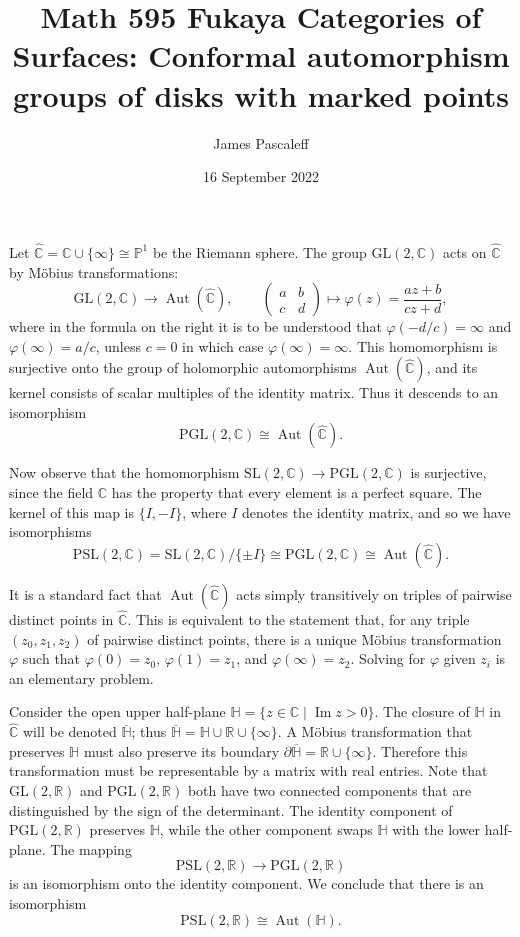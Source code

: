 \documentclass[12pt]{article}
\theoremstyle{definition}
\theoremstyle{remark}
\newcommand{\R}{\mathbb{R}}
\newcommand{\C}{\mathbb{C}}
\DeclareMathOperator{\Aut}{Aut}
\renewcommand{\phi}{\varphi}
\newcommand{\hC}{\widehat{\mathbb{C}}}
\newcommand{\bP}{\mathbb{P}}
\newcommand{\bH}{\mathbb{H}}
\newcommand{\GL}{\mathrm{GL}}
\newcommand{\SL}{\mathrm{SL}}
\newcommand{\PGL}{\mathrm{PGL}}
\newcommand{\PSL}{\mathrm{PSL}}
\DeclareMathOperator{\im}{\mathrm{Im}}
\begin{document}
\title{Math 595 Fukaya Categories of Surfaces: Conformal automorphism groups of disks with marked points}
\author{James Pascaleff}
\date{16 September 2022}
\maketitle

Let $\hC = \C \cup \{\infty\} \cong \bP^{1}$ be the Riemann sphere. The group $\GL(2,\C)$ acts on $\hC$ by M\"{o}bius transformations:
\begin{equation*}
  \GL(2,\C) \to \Aut(\hC), \qquad \begin{pmatrix}a&b\\ c&d\end{pmatrix} \mapsto \phi(z) = \frac{az+b}{cz+d},
\end{equation*}
where in the formula on the right it is to be understood that $\phi(-d/c) = \infty$ and $\phi(\infty) = a/c$, unless $c = 0$ in which case $\phi(\infty) = \infty$.
This homomorphism is surjective onto the group of holomorphic automorphisms $\Aut(\hC)$, and its kernel consists of scalar multiples of the identity matrix. Thus it descends to an isomorphism
\begin{equation*}
  \PGL(2,\C) \cong \Aut(\hC).
\end{equation*}

Now observe that the homomorphism $\SL(2,\C) \to \PGL(2,\C)$ is surjective, since the field $\C$ has the property that every element is a perfect square. The kernel of this map is $\{I, -I\}$, where $I$ denotes the identity matrix, and so we have isomorphisms
\begin{equation*}
  \PSL(2,\C) = \SL(2,\C)/\{\pm I\} \cong \PGL(2,\C) \cong \Aut(\hC).
\end{equation*}

It is a standard fact that $\Aut(\hC)$ acts simply transitively on triples of pairwise distinct points in $\hC$. This is equivalent to the statement that, for any triple $(z_{0},z_{1},z_{2})$ of pairwise distinct points, there is a unique M\"{o}bius transformation $\phi$ such that $\phi(0) = z_{0}$, $\phi(1) = z_{1}$, and $\phi(\infty) = z_{2}$. Solving for $\phi$ given $z_{i}$ is an elementary problem.

Consider the open upper half-plane $\bH = \{z \in \C \mid \im z > 0\}$. The closure of $\bH$ in $\hC$ will be denoted $\overline{\bH}$; thus $\overline{\bH} = \bH \cup \R \cup \{\infty\}$. A M\"{o}bius transformation that preserves $\bH$ must also preserve its boundary $\partial \overline{\bH} = \R \cup \{\infty\}$. Therefore this transformation must be representable by a matrix with real entries. Note that $\GL(2,\R)$ and $\PGL(2,\R)$ both have two connected components that are distinguished by the sign of the determinant. The identity component of $\PGL(2,\R)$ preserves $\bH$, while the other component swaps $\bH$ with the lower half-plane. The mapping
\begin{equation*}
  \PSL(2,\R) \to \PGL(2,\R)
\end{equation*}
is an isomorphism onto the identity component. We conclude that there is an isomorphism
\begin{equation*}
  \PSL(2,\R) \cong \Aut(\bH).
\end{equation*}
\end{document}
